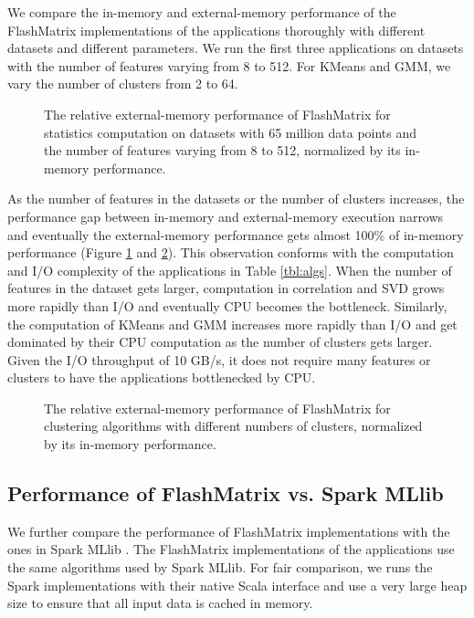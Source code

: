 We compare the in-memory and external-memory performance of the FlashMatrix
implementations of the applications thoroughly with different datasets and
different parameters. We run the first three applications on datasets with
the number of features varying from 8 to 512. For KMeans and GMM, we vary
the number of clusters from 2 to 64.

\begin{figure}
	\begin{center}
		\footnotesize
		
		\caption{The relative external-memory performance of FlashMatrix for
			statistics computation on datasets with 65 million data points
			and the number of features varying from 8 to 512, normalized by
		its in-memory performance.}
		\label{perf:stat}
	\end{center}
\end{figure}

As the number of features in the datasets or the number of clusters increases,
the performance gap between in-memory and external-memory execution
narrows and eventually the external-memory performance gets almost 100\%
of in-memory performance (Figure \ref{perf:stat} and \ref{perf:clust}).
This observation conforms with the computation and I/O complexity of
the applications in Table \ref{tbl:algs}. When the number of features
in the dataset gets larger, computation in correlation and SVD grows more
rapidly than I/O and eventually CPU becomes
the bottleneck. Similarly, the computation of KMeans and GMM increases
more rapidly than I/O and get dominated by their CPU computation as the number
of clusters gets larger. Given the I/O throughput of 10 GB/s, it does not
require many features or clusters to have the applications bottlenecked by
CPU.

\begin{figure}
	\begin{center}
		\footnotesize
		
		\caption{The relative external-memory performance of FlashMatrix for
			clustering algorithms with different numbers of clusters, normalized
		by its in-memory performance.}
		\label{perf:clust}
	\end{center}
\end{figure}

\subsection{Performance of FlashMatrix vs. Spark MLlib}

We further compare the performance of FlashMatrix implementations with the ones
in Spark MLlib \cite{mllib}. The FlashMatrix implementations of the applications
use the same algorithms used by Spark MLlib. For fair comparison, we runs the Spark
implementations with their native Scala interface and use a very large heap size
to ensure that all input data is cached in memory.

